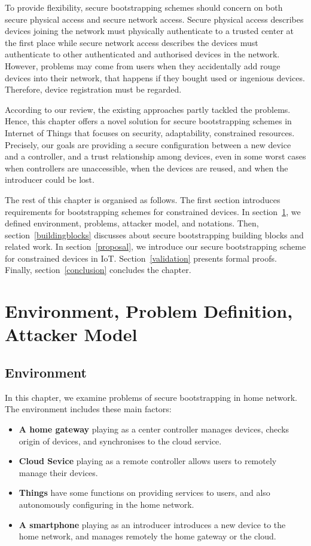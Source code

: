To provide flexibility, secure bootstrapping schemes should concern on both secure physical access and secure network access. Secure physical access describes devices joining the network must physically authenticate to a trusted center at the first place while secure network access describes the devices must authenticate to other authenticated and authorised devices in the network.  
However, problems may come from users when they accidentally add rouge devices into their network, that happens if they bought used or ingenious devices. Therefore, device registration must be regarded. 

According to our review, the existing approaches partly tackled the problems. Hence, this chapter offers a novel solution for secure bootstrapping schemes in Internet of Things that focuses on security, adaptability, constrained resources. Precisely, our goals are providing a secure configuration between a new device and a controller, and a trust relationship among devices, even in some worst cases when controllers are unaccessible, when the devices are reused, and when the introducer could be lost. 

The rest of this chapter is organised as follows. The first section introduces requirements for bootstrapping schemes for constrained devices.  In section~\ref{envi}, we defined environment, problems, attacker model, and notations. Then, section~\ref{buildingblocks} discusses about secure bootstrapping building blocks and related work. In section~\ref{proposal}, we introduce our secure bootstrapping scheme for constrained devices in IoT. Section~\ref{validation} presents formal proofs. Finally, section~\ref{conclusion} concludes the chapter. 

\section{Environment, Problem Definition, Attacker Model}\label{envi}

\subsection{Environment}

In this chapter, we examine problems of secure bootstrapping in home network. The environment includes these main factors:
\begin{itemize}
\item \textbf{A home gateway} playing as a center controller manages devices, checks origin of devices, and synchronises to the cloud service.
\item \textbf{Cloud Sevice} playing as a remote controller allows users to remotely manage their devices. 
\item \textbf{Things} have some functions on providing services to users, and also autonomously configuring in the home network.
\item \textbf{A smartphone} playing as an introducer introduces a new device to the home network, and manages remotely the home gateway or the cloud.
\end{itemize}

